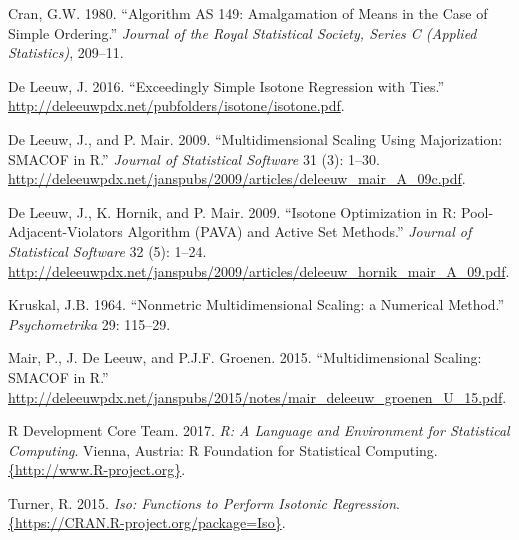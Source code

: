 \documentclass[12pt,]{article}
\begin{document}
\hypertarget{refs}{}
\hypertarget{ref-cran_80}{}
Cran, G.W. 1980. ``Algorithm AS 149: Amalgamation of Means in the Case
of Simple Ordering.'' \emph{Journal of the Royal Statistical Society,
Series C (Applied Statistics)}, 209--11.

\hypertarget{ref-deleeuw_E_16d}{}
De Leeuw, J. 2016. ``Exceedingly Simple Isotone Regression with Ties.''
\url{http://deleeuwpdx.net/pubfolders/isotone/isotone.pdf}.

\hypertarget{ref-deleeuw_mair_A_09c}{}
De Leeuw, J., and P. Mair. 2009. ``Multidimensional Scaling Using
Majorization: SMACOF in R.'' \emph{Journal of Statistical Software} 31
(3): 1--30.
\url{http://deleeuwpdx.net/janspubs/2009/articles/deleeuw_mair_A_09c.pdf}.

\hypertarget{ref-deleeuw_hornik_mair_A_09}{}
De Leeuw, J., K. Hornik, and P. Mair. 2009. ``Isotone Optimization in R:
Pool-Adjacent-Violators Algorithm (PAVA) and Active Set Methods.''
\emph{Journal of Statistical Software} 32 (5): 1--24.
\url{http://deleeuwpdx.net/janspubs/2009/articles/deleeuw_hornik_mair_A_09.pdf}.

\hypertarget{ref-kruskal_64b}{}
Kruskal, J.B. 1964. ``Nonmetric Multidimensional Scaling: a Numerical
Method.'' \emph{Psychometrika} 29: 115--29.

\hypertarget{ref-mair_deleeuw_groenen_U_15}{}
Mair, P., J. De Leeuw, and P.J.F. Groenen. 2015. ``Multidimensional
Scaling: SMACOF in R.''
\url{http://deleeuwpdx.net/janspubs/2015/notes/mair_deleeuw_groenen_U_15.pdf}.

\hypertarget{ref-R_17}{}
R Development Core Team. 2017. \emph{R: A Language and Environment for
Statistical Computing}. Vienna, Austria: R Foundation for Statistical
Computing.
\href{\%7Bhttp://www.R-project.org\%7D}{\{http://www.R-project.org\}}.

\hypertarget{ref-turner_15}{}
Turner, R. 2015. \emph{Iso: Functions to Perform Isotonic Regression}.
\href{\%7Bhttps://CRAN.R-project.org/package=Iso\%7D}{\{https://CRAN.R-project.org/package=Iso\}}.
\end{document}
